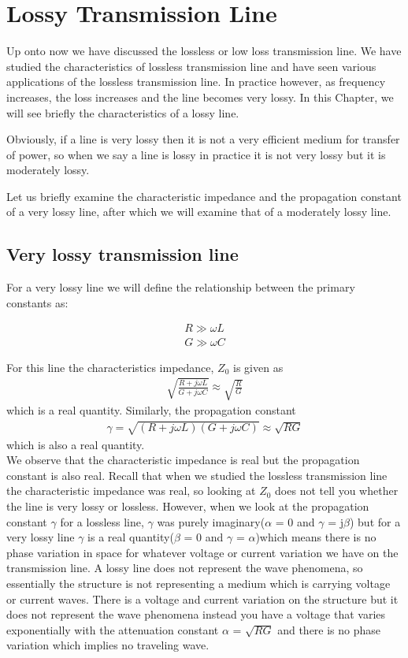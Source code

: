 \chapter{Lossy Transmission Line}\label{lec:lec13}
Up onto now we have discussed the lossless or low loss transmission line. We have studied the characteristics of lossless transmission line and have seen various applications of the lossless transmission line. In practice however, as frequency increases, the loss increases and the line becomes very lossy. In this Chapter, we will see briefly the characteristics of a lossy line.

Obviously, if a line is very lossy then it is not a very efficient medium for transfer of power, so when we say a line is lossy in practice it is not very lossy but it is moderately lossy.

Let us briefly examine the characteristic impedance and the propagation constant of a very lossy line, after which we will examine that of a moderately lossy line.

\section{Very lossy transmission line}For a very lossy line we will define the relationship between the primary constants as:

\begin{align*}
R\gg\omega L
\\G\gg\omega C
\end{align*}

For this line the characteristics impedance, $Z_0$ is given as
\begin{align*}
\sqrt{\frac{R + j\omega L}{G + j\omega C}} \approx  \sqrt{\frac{R}{G}}
\end{align*}
which is a real quantity. Similarly, the propagation constant 
\begin{align*}
\gamma = \sqrt{(R + j\omega L)(G + j\omega C)} \approx \sqrt{RG}
\end{align*}
which is also a real quantity.\\
We observe that the characteristic impedance is real but the propagation constant is also real. Recall that when we studied the lossless transmission line the characteristic impedance was real, so looking at $Z_0$ does not tell you whether the line is very lossy or lossless. However, when we look at the propagation constant  $\gamma$ for a lossless line, $\gamma$ was purely imaginary($\alpha$ = 0 and $\gamma$ = j$\beta$) but for  a very lossy line $\gamma$ is a real quantity($\beta$ = 0 and $\gamma$ = $\alpha$)which means there is no phase variation  in space for whatever voltage or current variation we have on the transmission line. A lossy line does not represent the wave phenomena, so essentially the structure is not representing a medium which is carrying voltage or current waves. There is a voltage and current variation on the structure but it does not represent the wave phenomena instead you have a voltage that varies exponentially with the attenuation constant $\alpha$ = $\sqrt{RG}$ and there is no phase variation which implies no traveling wave.


